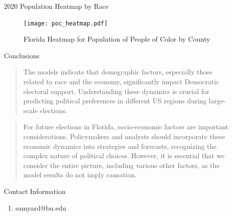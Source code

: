 \documentclass[xcolor=dvipsnames]{beamer}
\newlength{\sepwid}
\newlength{\onecolwid}
\newlength{\twocolwid}
\begin{document}
\begin{frame}[t]
\begin{columns}[t]
\begin{column}{\twocolwid}
\end{column} %

\begin{column}{\sepwid}\end{column} %

\begin{column}{\onecolwid} %



\begin{block}{2020 Population Heatmap by Race}

\begin{figure}
\texttt{[image: poc\_heatmap.pdf]}
\caption{Florida Heatmap for Population of People of Color by County}
\end{figure}
\end{block}

\begin{block}{Conclusions}\\
\begin{quote}
The models indicate that demographic factors, especially those related to race and the economy, significantly impact Democratic electoral support. Understanding these dynamics is crucial for predicting political preferences in different US regions during large-scale elections.
\end{quote}
\newline
\begin{quote}
For future elections in Florida, socio-economic factors are important considerations. Policymakers and analysts should incorporate these economic dynamics into strategies and forecasts, recognizing the complex nature of political choices. However, it is essential that we consider the entire picture, including various other factors, as the model results do not imply causation.
\end{quote}
\end{block}


\begin{alertblock}{Contact Information}
\begin{enumerate}
    \item [\textcolor{black}{\textbullet}]samyard@bu.edu
\end{enumerate}


\end{alertblock}
\end{column}
\end{columns}
\end{frame}
\end{document}
